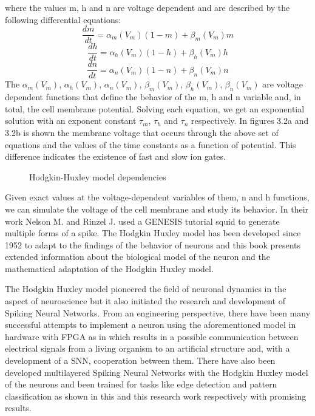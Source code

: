 \documentclass[12pt]{report}
\begin{document}
where the values m, h and n are voltage dependent and are described by the following differential equations:
\begin{equation}
\frac{dm}{dt}=\alpha_m(V_m)(1-m)+\beta_m(V_m)m
\end{equation}
\begin{equation}
\frac{dh}{dt}=\alpha_h(V_m)(1-h)+\beta_h(V_m)h
\end{equation}
\begin{equation}
\frac{dn}{dt}=\alpha_n(V_m)(1-n)+\beta_n(V_m)n
\end{equation}
The \(\alpha_m(V_m)\), \(\alpha_h(V_m)\), \(\alpha_n(V_m)\), \(\beta_m(V_m)\), \(\beta_h(V_m)\), \(\beta_n(V_m)\) are voltage dependent functions that define the behavior of the m, h and n variable and, in total, the cell membrane potential. Solving each equation, we get an exponential solution with an exponent constant \(\tau_m\), \(\tau_h\) and \(\tau_n\) respectively. In figures 3.2a and 3.2b is shown the membrane voltage that occurs through the above set of equations and the values of the time constants as a function of potential. This difference indicates the existence of fast and slow ion gates.

\begin{figure}[htp]
    \centering
    \hfill
    \caption{Hodgkin-Huxley model dependencies}
\end{figure}

Given exact values at the voltage-dependent variables of them, n and h functions, we can simulate the voltage of the cell membrane and study its behavior. In their work \cite{NelsonM} Nelson M. and Rinzel J. used a GENESIS tutorial squid \cite{squid} to generate multiple forms of a spike. The Hodgkin Huxley model has been developed since 1952 to adapt to the findings of the behavior of neurons and this book \cite{gerstner2014} presents extended information about the biological model of the neuron and the mathematical adaptation of the Hodgkin Huxley model.

The Hodgkin Huxley model pioneered the field of neuronal dynamics in the aspect of neuroscience but it also initiated the research and development of Spiking Neural Networks. From an engineering perspective, there have been many successful attempts to implement a neuron using the aforementioned model in hardware with FPGA as in \cite{Levi2018} which results in a possible communication between electrical signals from a living organism to an artificial structure and, with a development of a SNN, cooperation between them. There have also been developed multilayered Spiking Neural Networks with the Hodgkin Huxley model of the neurons and been trained for tasks like edge detection and pattern classification as shown in this \cite{Yedjour2017} and this \cite{pattern2016} research work respectively with promising results.
\end{document}
